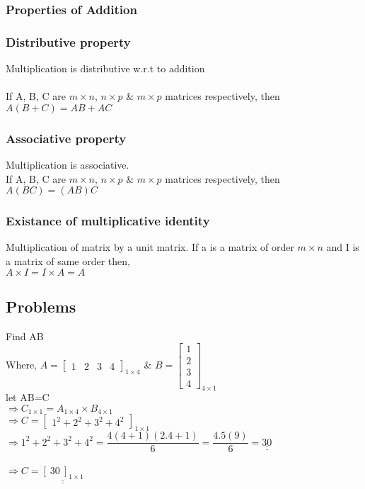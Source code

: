 \documentclass{article}
\begin{document}
	\subsubsection{Properties of Addition}
	\subsubsection*{Distributive property}
	Multiplication is distributive w.r.t to addition \\ \\
	If A, B, C are $ m \times n $, $ n \times p $ \& $ m \times p $ matrices respectively, then \\
	\tab \tab $ A(B+C) = AB + AC $
	
	\subsubsection*{Associative property}
	Multiplication is associative. \\
	If A, B, C are $ m \times n $, $ n \times p $ \& $ m \times p $ matrices respectively, then \\
	\tab \tab $ A(BC) = (AB)C $
	
	\subsubsection*{Existance of multiplicative identity}
	Multiplication of matrix by a unit matrix. If a is a matrix of order $ m \times n $ and I is a matrix of same order then, \\
	\tab \tab $ A \times I = I \times A = A $
	
	\newpage
	
	\subsection{Problems}
	Find AB \\
	Where, $ A = [\begin{array}{cccc}
		1 & 2 & 3 & 4
	\end{array}]_{1 \times 4}$ \& $ B=\left[ \begin{array}{c}
		1 \\ 2 \\ 3 \\ 4
	\end{array}\right]_{4 \times 1}$ \\
	let AB=C \\
	$\Longrightarrow C_{1 \times 1} = A_{1 \times 4} \times B_{4 \times 1}$ \\
	$ \Longrightarrow C =  \left[ \begin{array}{cccc}
		1^2 + 2^2 + 3^2 + 4^2
	\end{array}\right]_{1 \times 1}$ \\
	$$ \Longrightarrow 1^2 + 2^2 + 3^2 + 4^2 = \frac{4(4+1)(2.4+1)}{6} = \frac{4.5(9)}{6} = \underline{\underline{30}} \qquad \qquad \qquad \qquad \qquad \qquad \qquad \qquad \qquad \qquad \qquad \qquad \qquad \qquad $$ \\
	$ \Longrightarrow C = \underline{\underline{[~30~]_{1 \times 1}}} $
	
	
\end{document}

